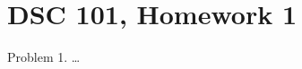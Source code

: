 \documentclass{article}
\begin{document}
\section*{DSC 101, Homework 1}
Problem 1. \dots
\end{document}
